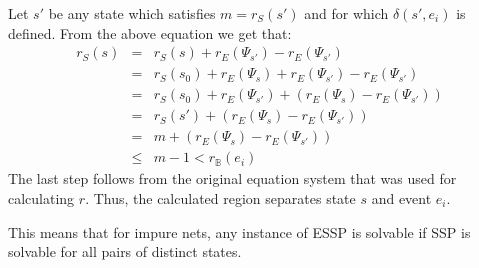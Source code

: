 \documentclass{scrartcl}
\newcommand{\B}{\mathbb{B}}
\newcommand{\1}{\textbf{1}}
\begin{document}
Let \(s'\) be any state which satisfies \(m=r_S(s')\) and for which \(\delta(s',e_i)\) is defined.
From the above equation we get that:
\begin{eqnarray*}
r_S(s)&=&r_S(s)+r_E(\Psi_{s'})-r_E(\Psi_{s'}) \\
&=&r_S(s_0)+r_E(\Psi_s)+r_E(\Psi_{s'})-r_E(\Psi_{s'}) \\
&=&r_S(s_0)+r_E(\Psi_{s'})+(r_E(\Psi_s)-r_E(\Psi_{s'})) \\
&=&r_S(s')+(r_E(\Psi_s)-r_E(\Psi_{s'})) \\
&=&m+(r_E(\Psi_s)-r_E(\Psi_{s'})) \\
&\leq&m-1 < r_\B(e_i)
\end{eqnarray*}
The last step follows from the original equation system that was used for calculating \(r\).
Thus, the calculated region separates state \(s\) and event \(e_i\).

This means that for impure nets, any instance of ESSP is solvable if SSP is solvable for all pairs of distinct states.
\end{document}
